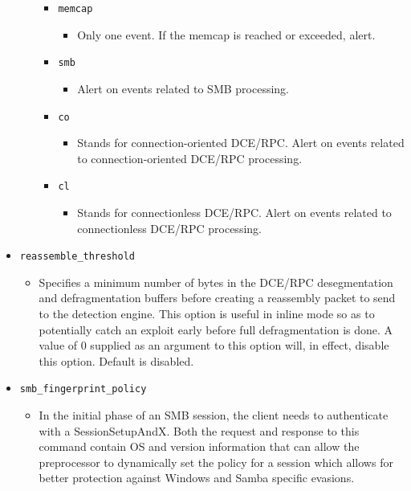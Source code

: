 \documentclass[english]{report}
\begin{document}
\begin{itemize}
\begin{itemize}
\begin{itemize}
\item[] \texttt{memcap}

\begin{itemize}
\item[] Only one event. If the memcap is reached or exceeded, alert.

\end{itemize}

\item[] \texttt{smb}

\begin{itemize}
\item[] Alert on events related to SMB processing.
\end{itemize}

\item[] \texttt{co}

\begin{itemize}

\item[] Stands for connection-oriented DCE/RPC. Alert on events related to
connection-oriented DCE/RPC processing.

\end{itemize}

\item[] \texttt{cl}
\begin{itemize}

\item[] Stands for connectionless DCE/RPC. Alert on events related to
connectionless DCE/RPC processing.

\end{itemize}
\end{itemize}
\end{itemize}

\item[] \texttt{reassemble\_threshold}
\begin{itemize}

\item[] Specifies a minimum number of bytes in the DCE/RPC desegmentation and
defragmentation buffers before creating a reassembly packet to send to the
detection engine. This option is useful in inline mode so as to potentially
catch an exploit early before full defragmentation is done.  A value of 0
supplied as an argument to this option will, in effect, disable this option.
Default is disabled.

\end{itemize}

\item[] \texttt{smb\_fingerprint\_policy}
\begin{itemize}

\item[] In the initial phase of an SMB session, the client needs to authenticate
with a SessionSetupAndX.  Both the request and response to this command
contain OS and version information that can allow the preprocessor to
dynamically set the policy for a session which allows for better
protection against Windows and Samba specific evasions.

\end{itemize}
\end{itemize}
\end{document}
